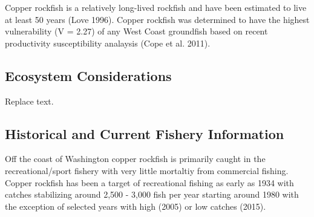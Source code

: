 \documentclass[11pt,
  english,
  a4paper,
]{article}
\begin{document}
\leavevmode\tagmcend\tagstructend\par


Copper rockfish is a relatively long-lived rockfish and have been estimated to live at least 50 years {(Love 1996)\leavevmode\tagmcend\tagstructend}. Copper rockfish was determined to have the highest vulnerability (V = 2.27) of any West Coast groundfish based on recent productivity susceptibility analaysis {(Cope et al. 2011)\leavevmode\tagmcend\tagstructend}.

\leavevmode\tagmcend\tagstructend\par


\hypertarget{ecosystem-considerations}{%
\subsection{Ecosystem Considerations}\label{ecosystem-considerations}}

\leavevmode\tagmcend\tagstructend


Replace text.

\leavevmode\tagmcend\tagstructend\par


\hypertarget{historical-and-current-fishery-information}{%
\subsection{Historical and Current Fishery Information}\label{historical-and-current-fishery-information}}

\leavevmode\tagmcend\tagstructend


Off the coast of Washington copper rockfish is primarily caught in the recreational/sport fishery with very little mortaltiy from commercial fishing. Copper rockfish has been a target of recreational fishing as early as 1934 with catches stabilizing around 2,500 - 3,000 fish per year starting around 1980 with the exception of selected years with high (2005) or low catches (2015).

\leavevmode\tagmcend\tagstructend\par
\end{document}
